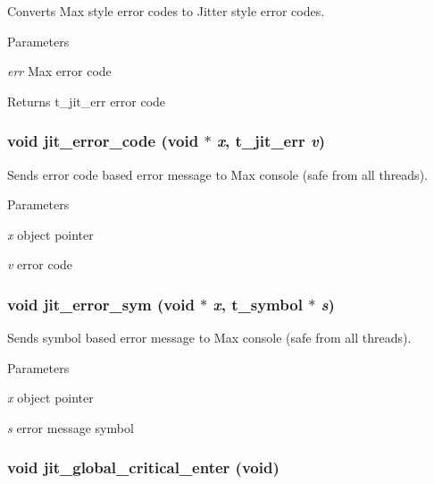 Converts Max style error codes to Jitter style error codes. 
\begin{DoxyParams}{Parameters}
\item[{\em err}]Max error code\end{DoxyParams}
\begin{DoxyReturn}{Returns}
t\_\-jit\_\-err error code 
\end{DoxyReturn}
\hypertarget{group__utilitymod_ga65b95cf6d8f87c67d0333a6baf17aa63}{
\subsubsection[{jit\_\-error\_\-code}]{\setlength{\rightskip}{0pt plus 5cm}void jit\_\-error\_\-code (void $\ast$ {\em x}, \/  t\_\-jit\_\-err {\em v})}}
\label{group__utilitymod_ga65b95cf6d8f87c67d0333a6baf17aa63}


Sends error code based error message to Max console (safe from all threads). 
\begin{DoxyParams}{Parameters}
\item[{\em x}]object pointer \item[{\em v}]error code \end{DoxyParams}
\hypertarget{group__utilitymod_gae0572119ae652a87ae84f181d439d0e9}{
\subsubsection[{jit\_\-error\_\-sym}]{\setlength{\rightskip}{0pt plus 5cm}void jit\_\-error\_\-sym (void $\ast$ {\em x}, \/  {\bf t\_\-symbol} $\ast$ {\em s})}}
\label{group__utilitymod_gae0572119ae652a87ae84f181d439d0e9}


Sends symbol based error message to Max console (safe from all threads). 
\begin{DoxyParams}{Parameters}
\item[{\em x}]object pointer \item[{\em s}]error message symbol \end{DoxyParams}
\hypertarget{group__utilitymod_gace84dbb97cc894c7af080f676de34781}{
\subsubsection[{jit\_\-global\_\-critical\_\-enter}]{\setlength{\rightskip}{0pt plus 5cm}void jit\_\-global\_\-critical\_\-enter (void)}}
\label{group__utilitymod_gace84dbb97cc894c7af080f676de34781}


